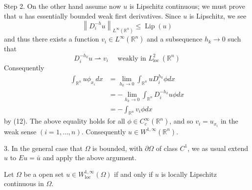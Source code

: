 \begin{theorem}
    Step 2.
    On the other hand assume now $u$ is Lipschitz continuous; we must prove that $u$ has essentially bounded weak first derivatives. Since $u$ is Lipschitz, we see
    \begin{equation*}
        \left\|D_i^{-h} u\right\|_{L^{\infty}\left(\mathbb{R}^n\right)} \leq \operatorname{Lip}(u)
    \end{equation*}
    and thus there exists a function $v_i \in L^{\infty}\left(\mathbb{R}^n\right)$ and a subsequence $h_k \rightarrow 0$ such that
    \begin{equation*}
        D_i^{-h_k} u \rightharpoonup v_i \quad \text { weakly in } L_{\text {loc }}^2\left(\mathbb{R}^n\right)
    \end{equation*}
    Consequently
    \begin{equation*}
        \begin{aligned}
            \int_{\mathbb{R}^n} u \phi_{x_i} d x & =\lim _{h_k \rightarrow 0} \int_{\mathbb{R}^n} u D_i^{h_k} \phi d x   \\
                                                 & =-\lim _{h_k \rightarrow 0} \int_{\mathbb{R}^n} D_i^{-h_k} u \phi d x \\
                                                 & =-\int_{\mathbb{R}^n} v_i \phi d x
        \end{aligned}
    \end{equation*}
    by (12). The above equality holds for all $\phi \in C_c^{\infty}\left(\mathbb{R}^n\right)$, and so $v_i=u_{x_i}$ in the weak sense $(i=1, \ldots, n)$. Consequently $u \in W^{1, \infty}\left(\mathbb{R}^n\right)$.

    3. In the general case that $\Omega$ is bounded, with $\partial \Omega$ of class $C^1$, we as usual extend $u$ to $E u=\bar{u}$ and apply the above argument.
\end{theorem}

\begin{corollary}
    Let $\Omega$ be a open set $u \in W_{\text {loc }}^{1, \infty}\left(\Omega\right)$ if and only if $u$ is locally Lipschitz continuous in $\Omega$.
\end{corollary}

